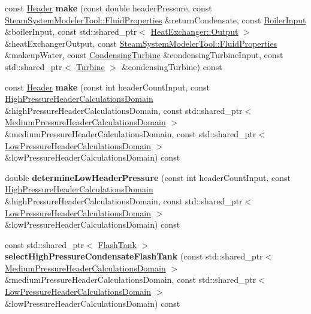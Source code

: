 \begin{DoxyCompactItemize}
const \hyperlink{class_header}{Header} {\bfseries make} (const double header\+Pressure, const \hyperlink{struct_steam_system_modeler_tool_1_1_fluid_properties}{Steam\+System\+Modeler\+Tool\+::\+Fluid\+Properties} \&return\+Condensate, const \hyperlink{class_boiler_input}{Boiler\+Input} \&boiler\+Input, const std\+::shared\+\_\+ptr$<$ \hyperlink{struct_heat_exchanger_1_1_output}{Heat\+Exchanger\+::\+Output} $>$ \&heat\+Exchanger\+Output, const \hyperlink{struct_steam_system_modeler_tool_1_1_fluid_properties}{Steam\+System\+Modeler\+Tool\+::\+Fluid\+Properties} \&makeup\+Water, const \hyperlink{class_condensing_turbine}{Condensing\+Turbine} \&condensing\+Turbine\+Input, const std\+::shared\+\_\+ptr$<$ \hyperlink{class_turbine}{Turbine} $>$ \&condensing\+Turbine) const
\item 
\mbox{\label{class_header_factory_affb7bdf26093f8f662366a312b997d09}} 
const \hyperlink{class_header}{Header} {\bfseries make} (const int header\+Count\+Input, const \hyperlink{class_high_pressure_header_calculations_domain}{High\+Pressure\+Header\+Calculations\+Domain} \&high\+Pressure\+Header\+Calculations\+Domain, const std\+::shared\+\_\+ptr$<$ \hyperlink{class_medium_pressure_header_calculations_domain}{Medium\+Pressure\+Header\+Calculations\+Domain} $>$ \&medium\+Pressure\+Header\+Calculations\+Domain, const std\+::shared\+\_\+ptr$<$ \hyperlink{class_low_pressure_header_calculations_domain}{Low\+Pressure\+Header\+Calculations\+Domain} $>$ \&low\+Pressure\+Header\+Calculations\+Domain) const
\item 
\mbox{\label{class_header_factory_af015658ac803d2fb4248f59847c40338}} 
double {\bfseries determine\+Low\+Header\+Pressure} (const int header\+Count\+Input, const \hyperlink{class_high_pressure_header_calculations_domain}{High\+Pressure\+Header\+Calculations\+Domain} \&high\+Pressure\+Header\+Calculations\+Domain, const std\+::shared\+\_\+ptr$<$ \hyperlink{class_low_pressure_header_calculations_domain}{Low\+Pressure\+Header\+Calculations\+Domain} $>$ \&low\+Pressure\+Header\+Calculations\+Domain) const
\item 
\mbox{\label{class_header_factory_a292dfee908d96fa136ae530667bd661d}} 
const std\+::shared\+\_\+ptr$<$ \hyperlink{class_flash_tank}{Flash\+Tank} $>$ {\bfseries select\+High\+Pressure\+Condensate\+Flash\+Tank} (const std\+::shared\+\_\+ptr$<$ \hyperlink{class_medium_pressure_header_calculations_domain}{Medium\+Pressure\+Header\+Calculations\+Domain} $>$ \&medium\+Pressure\+Header\+Calculations\+Domain, const std\+::shared\+\_\+ptr$<$ \hyperlink{class_low_pressure_header_calculations_domain}{Low\+Pressure\+Header\+Calculations\+Domain} $>$ \&low\+Pressure\+Header\+Calculations\+Domain) const

\end{DoxyCompactItemize}
